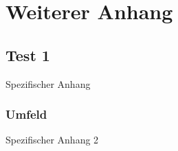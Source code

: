 \chapter{Weiterer Anhang}
\label{chap:anhang_B}

\section{Test 1}

Spezifischer Anhang

\subsection{Umfeld}

Spezifischer Anhang 2
